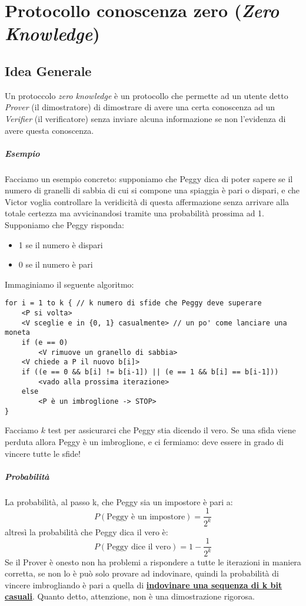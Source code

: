 \chapter{Protocollo conoscenza zero (\emph{Zero Knowledge})}

\section{Idea Generale}
Un protoccolo \emph{zero knowledge} è un protocollo che permette ad un utente detto \emph{Prover} (il dimostratore) di dimostrare di avere una certa conoscenza ad un \emph{Verifier} (il verificatore) senza inviare alcuna informazione se non l'evidenza di avere questa conoscenza.

\paragraph{Esempio} Facciamo un esempio concreto: supponiamo che Peggy dica di poter sapere se il numero di granelli di sabbia di cui si compone una spiaggia è pari o dispari, e che Victor voglia controllare la veridicità di questa affermazione senza arrivare alla totale certezza ma avvicinandosi tramite una probabilità prossima ad 1. Supponiamo che Peggy risponda:
\begin{itemize}
    \item 1 se il numero è dispari
    \item 0 se il numero è pari
\end{itemize}
Immaginiamo il seguente algoritmo:
\begin{verbatim}
for i = 1 to k { // k numero di sfide che Peggy deve superare
    <P si volta>
    <V sceglie e in {0, 1} casualmente> // un po' come lanciare una moneta
    if (e == 0)
        <V rimuove un granello di sabbia>
    <V chiede a P il nuovo b[i]>
    if ((e == 0 && b[i] != b[i-1]) || (e == 1 && b[i] == b[i-1]))
        <vado alla prossima iterazione>
    else
        <P è un imbroglione -> STOP>
}
\end{verbatim}
Facciamo $k$ test per assicurarci che Peggy stia dicendo il vero. Se una sfida viene perduta allora Peggy è un imbroglione, e ci fermiamo: deve essere in grado di vincere tutte le sfide!
\paragraph{Probabilità} La probabilità, al passo k, che Peggy sia un impostore è pari a:
$$
    P(\text{Peggy è un impostore})=\frac{1}{2^k}
$$
altresì la probabilità che Peggy dica il vero è:
$$
    P(\text{Peggy dice il vero})=1 - \frac{1}{2^k}
$$
Se il Prover è onesto non ha problemi a rispondere a tutte le iterazioni in maniera corretta, se non lo è può solo provare ad indovinare, quindi la probabilità di vincere imbrogliando è pari a quella di \textbf{\underline{indovinare una sequenza di k bit casuali}}. Quanto detto, attenzione, non è una dimostrazione rigorosa.


